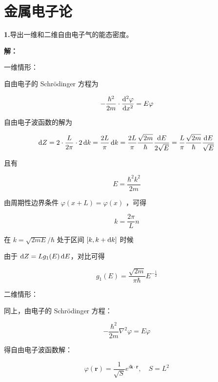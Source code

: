 \chapter{金属电子论\label{ch:6}}

\noindent \textbf{1.\quad}导出一维和二维自由电子气的能态密度。

\noindent \textbf{解：}

一维情形：

自由电子的 Schrödinger 方程为

\begin{equation*}
    -\frac{\hbar^2}{2m} \cdot \frac{\mathop{}\!\mathrm{d}^2 \varphi}{\mathop{}\!\mathrm{d} x^2} = E \varphi
\end{equation*}

自由电子波函数的解为

\begin{equation*}
    \mathop{}\!\mathrm{d} Z = 2 \cdot \frac{L}{2\pi} \cdot 2 \mathop{}\!\mathrm{d} k = \frac{2L}{\pi} \mathop{}\!\mathrm{d} k = \frac{2L}{\pi} \frac{\sqrt{2m}}{\hbar} \frac{\mathop{}\!\mathrm{d} E}{2 \sqrt{E}} = \frac{L}{\pi} \frac{\sqrt{2m}}{\hbar} \frac{\mathop{}\!\mathrm{d} E}{\sqrt{E}}
\end{equation*}

且有

\begin{equation*}
    E = \frac{\hbar^2 k^2}{2m}
\end{equation*}

由周期性边界条件 $\varphi(x+L)=\varphi(x)$ ，可得

\begin{equation*}
    k = \frac{2\pi}{L} n
\end{equation*}

在 $k=\sqrt{2mE}/\hbar$ 处于区间 $[k, k+\mathop{}\!\mathrm{d} k]$ 时候

由于 $\mathop{}\!\mathrm{d} Z = L g_1(E) \mathop{}\!\mathrm{d} E$，对比可得

\begin{equation*}
    g_1(E) = \frac{\sqrt{2m}}{\pi\hbar} E^{-\frac{1}{2}}
\end{equation*}

二维情形：

同上，由电子的 Schrödinger 方程：

\begin{equation*}
    -\frac{\hbar^2}{2m} \nabla^2 \varphi = E \varphi
\end{equation*}

得自由电子波函数解：

\begin{equation*}
    \varphi(\mathbf{r}) = \frac{1}{\sqrt{S}} e^{i \mathbf{k} \cdot \mathbf{r}}, \quad S = L^2
\end{equation*}

